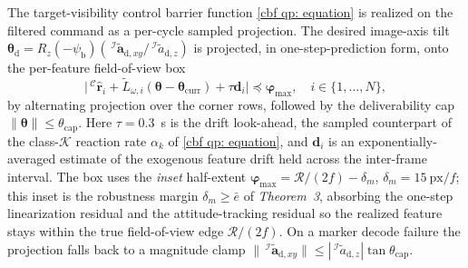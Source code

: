 \documentclass{IEEEtaes}
\begin{document}
The target-visibility control barrier function \eqref{cbf qp: equation} is realized on the filtered command as a per-cycle sampled projection. The desired image-axis tilt $\boldsymbol{\theta}_\text{d}=R_z(-\psi_\text{b})(\,^\mathcal{I}\tilde{\boldsymbol{a}}_{\text{d},xy}/\,^\mathcal{I}\tilde{a}_{\text{d},z})$ is projected, in one-step-prediction form, onto the per-feature field-of-view box
\begin{equation} \label{cbf projection: equation}
    \big|\,^\mathcal{C}\hat{\boldsymbol{r}}_i+\tilde{L}_{\omega,i}(\boldsymbol{\theta}-\boldsymbol{\theta}_\text{curr})+\tau\boldsymbol{d}_i\big|\preceq\boldsymbol{\varphi}_\text{max},\quad i\in\{1,\ldots,N\},
\end{equation}
by alternating projection over the corner rows, followed by the deliverability cap $\|\boldsymbol{\theta}\|\le\theta_\text{cap}$. Here $\tau=0.3$~s is the drift look-ahead, the sampled counterpart of the class-$\mathcal{K}$ reaction rate $\alpha_k$ of \eqref{cbf qp: equation}, and $\boldsymbol{d}_i$ is an exponentially-averaged estimate of the exogenous feature drift held across the inter-frame interval. The box uses the \emph{inset} half-extent $\boldsymbol{\varphi}_\text{max}=\mathcal{R}/(2f)-\delta_m$, $\delta_m=15~\text{px}/f$; this inset is the robustness margin $\delta_m\ge\bar{e}$ of \textit{Theorem~3}, absorbing the one-step linearization residual and the attitude-tracking residual so the realized feature stays within the true field-of-view edge $\mathcal{R}/(2f)$. On a marker decode failure the projection falls back to a magnitude clamp $\|\,^\mathcal{I}\tilde{\boldsymbol{a}}_{\text{d},xy}\|\le|\,^\mathcal{I}\tilde{a}_{\text{d},z}|\tan\theta_\text{cap}$.
\end{document}
